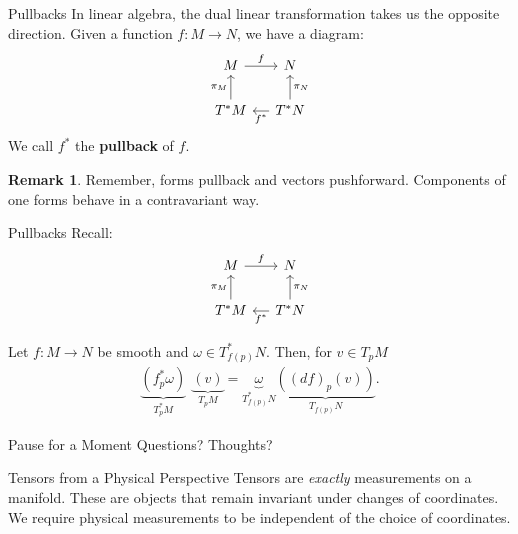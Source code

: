 \documentclass[usenames,dvipsnames]{beamer}
\theoremstyle{definition}
\newtheorem*{remark}{Remark}
\theoremstyle{theorem}
\begin{document}
        \begin{frame}{Pullbacks}
            In linear algebra, the dual linear transformation takes us the opposite direction.  Given a function $f\colon M \to N$, we have a diagram:
            \[
                \begin{tikzcd}[ampersand replacement=\&, column sep=small]
                M \arrow[r, "f"] \& N \\
                T^*M \arrow[u, "\pi_M"] \& T^*N \arrow[u, "\pi_N"'] \arrow[l, "f^*"]
                \end{tikzcd}            
            \]
            We call $f^*$ the \textbf{pullback} of $f$. 
            \begin{remark}
                Remember, forms pullback and vectors pushforward. Components of one forms behave in a contravariant way.
            \end{remark}
        \end{frame}
        
        \begin{frame}{Pullbacks}
        Recall:
        \[
                \begin{tikzcd}[ampersand replacement=\&, column sep=small]
                M \arrow[r, "f"] \& N \\
                T^*M \arrow[u, "\pi_M"] \& T^*N \arrow[u, "\pi_N"'] \arrow[l, "f^*"]
                \end{tikzcd}            
        \]
            \begin{example}
                Let $f\colon M \to N$ be smooth and $\omega \in T_{f(p)}^*N$.  Then, for $v\in T_pM$
                \begin{align*}
                    \underbrace{(f_p^* \omega)}_{\textrm{$T_p^*M$}}~~\underbrace{(v)}_{\textrm{$T_pM$}}=\underbrace{\omega}_{\textrm{$T_{f(p)}^*N$}}\underbrace{((df)_p(v))}_{\textrm{$T_{f(p)}N$}}.
                \end{align*}
            \end{example}
        \end{frame}
        
        \begin{frame}{Pause for a Moment}
            Questions? Thoughts?
        \end{frame}

        \begin{frame}{Tensors from a Physical Perspective}
            Tensors are \emph{exactly} measurements on a manifold. These are objects that remain invariant under changes of coordinates.  We require physical measurements to be independent of the choice of coordinates.
        \end{frame}
        
\end{document}
